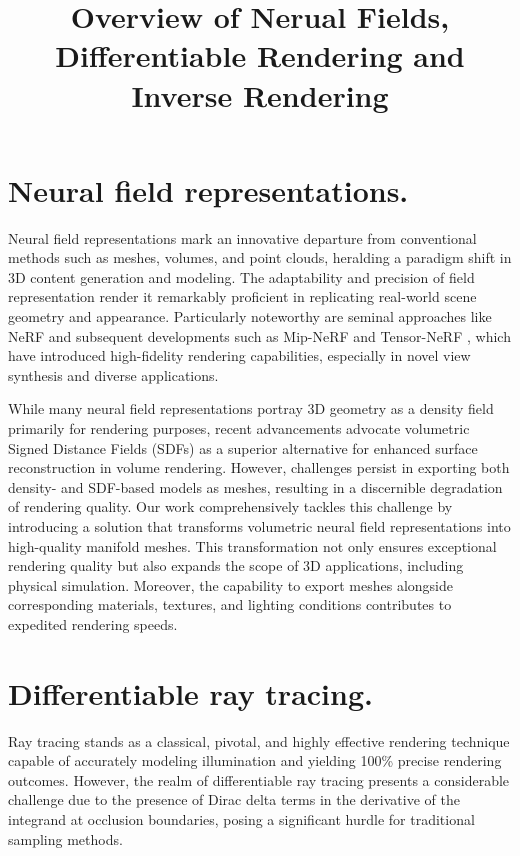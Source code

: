 
\begin{survey}
\label{cha:survey}

\title{Overview of Nerual Fields, Differentiable Rendering and Inverse Rendering}
\maketitle

\tableofcontents

\section{Neural field representations.} Neural field representations mark an innovative departure from conventional methods such as meshes, volumes, and point clouds, heralding a paradigm shift in 3D content generation and modeling. The adaptability and precision of field representation render it remarkably proficient in replicating real-world scene geometry and appearance. Particularly noteworthy are seminal approaches like NeRF \cite{nerf} and subsequent developments such as Mip-NeRF \cite{mipnerf} and Tensor-NeRF \cite{tensorf}, which have introduced high-fidelity rendering capabilities, especially in novel view synthesis and diverse applications.

While many neural field representations portray 3D geometry as a density field primarily for rendering purposes, recent advancements advocate volumetric Signed Distance Fields (SDFs) as a superior alternative for enhanced surface reconstruction in volume rendering. However, challenges persist in exporting both density- and SDF-based models as meshes, resulting in a discernible degradation of rendering quality. Our work comprehensively tackles this challenge by introducing a solution that transforms volumetric neural field representations into high-quality manifold meshes. This transformation not only ensures exceptional rendering quality but also expands the scope of 3D applications, including physical simulation. Moreover, the capability to export meshes alongside corresponding materials, textures, and lighting conditions contributes to expedited rendering speeds.

\section{Differentiable ray tracing.} Ray tracing stands as a classical, pivotal, and highly effective rendering technique capable of accurately modeling illumination and yielding 100\% precise rendering outcomes. However, the realm of differentiable ray tracing presents a considerable challenge due to the presence of Dirac delta terms in the derivative of the integrand at occlusion boundaries, posing a significant hurdle for traditional sampling methods.


\end{survey}

